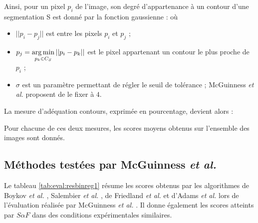 Ainsi, pour un pixel $p_{i}$ de l'image, son degré d'appartenance à un contour d'une segmentation S est donné par la fonction gaussienne :
où
\begin{itemize}
\item $|| p_{i} - p_{j}||$ est  entre les pixels $p_{i}$ et $p_{j}$ ;
\item $\displaystyle p_{j} = \operatorname*{arg\,min}_{p_{k} \in C_{S}} ||p_{i}-p_{k}||$ est le pixel\modif{,} appartenant  un contour\modif{,} le plus proche de $p_{i}$ ;
\item $\sigma$ est un paramètre permettant de régler le seuil de tolérance ; McGuinness \textit{et al.} proposent de le fixer à  $4$.
\end{itemize}
La mesure d'adéquation  contours, exprimée en pourcentage, devient alors :

Pour chacune de ces deux mesures,  les scores moyens obtenus sur l'ensemble des images sont donnés.

\subsection{Méthodes testées par McGuinness \textit{et al.}}

Le tableau \ref{tab:eval:resbinreg1} résume les scores obtenus par les algorithmes de  Boykov \textit{et al.}  \cite{boykov2001interactive},  Salembier \textit{et al.} \cite{salembier2000binary}, de Friedland \textit{et al.} \cite{friedland2005siox} et d'Adams \textit{et al.} \cite{adams1994seeded} lors de l'évaluation réalisée par McGuinness \textit{et al.} \cite{mcguinness2010comparative}. Il donne également les scores atteints par $S \alpha F$ dans des conditions expérimentales similaires. 

